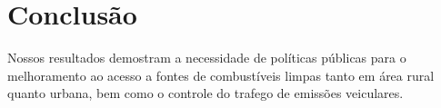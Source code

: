 \chapter{Conclusão}

Nossos resultados demostram a necessidade de políticas públicas para o 
melhoramento ao acesso a fontes de combustíveis limpas tanto em área rural 
quanto urbana, bem como o controle do trafego de emissões veiculares.

